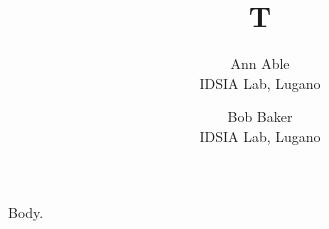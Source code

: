 \documentclass{article}
\begin{document}
\title{T}
\author{Ann Able\\ IDSIA Lab, Lugano \and Bob Baker\\ IDSIA Lab, Lugano}
\maketitle
Body.
\end{document}
